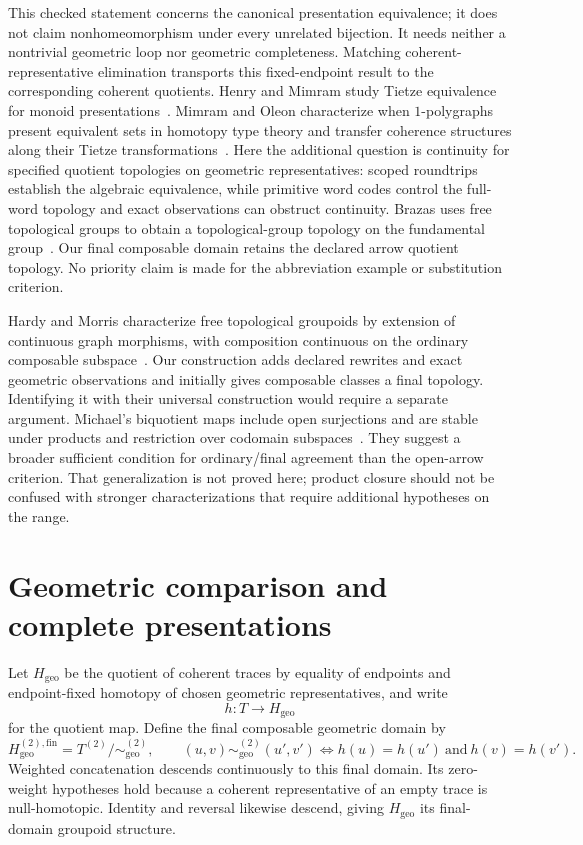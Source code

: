 \documentclass[10pt,reqno]{amsart}
\theoremstyle{definition}
\theoremstyle{plain}
\theoremstyle{remark}
\newcommand{\Fin}{\mathrm{fin}}
\begin{document}



This checked statement concerns the canonical presentation equivalence; it
does not claim nonhomeomorphism under every unrelated bijection. It needs
neither a nontrivial geometric loop nor geometric completeness. Matching
coherent-representative elimination transports this fixed-endpoint result
to the corresponding coherent quotients. Henry and Mimram study Tietze
equivalence for monoid presentations~\cite{HenryMimram21}. Mimram and Oleon
characterize when $1$-polygraphs present equivalent sets in homotopy type
theory and transfer coherence structures along their Tietze
transformations~\cite{MimramOleon25}. Here the additional question is
continuity for specified quotient topologies on geometric representatives:
scoped roundtrips establish the algebraic equivalence, while primitive word
codes control the full-word topology and exact observations can obstruct
continuity. Brazas uses free topological groups to
obtain a topological-group topology on the fundamental
group~\cite{Brazas13Tau}. Our final composable domain retains the declared
arrow quotient topology. No priority claim is made for the abbreviation
example or substitution criterion.

Hardy and Morris characterize free topological groupoids by extension of
continuous graph morphisms, with composition continuous on the ordinary
composable subspace~\cite{HardyMorris77}. Our construction adds declared
rewrites and exact geometric observations and initially gives composable
classes a final topology. Identifying it with their universal construction
would require a separate argument. Michael's biquotient maps include open
surjections and are stable under products and restriction over codomain
subspaces~\cite{Michael68}. They suggest a broader sufficient condition for
ordinary/final agreement than the open-arrow criterion. That generalization
is not proved here; product closure should not be confused with stronger
characterizations that require additional hypotheses on the range.

\section{Geometric comparison and complete presentations}
\label{sec:comparison}

Let $H_{\mathrm{geo}}$ be the quotient of coherent traces by equality of
endpoints and endpoint-fixed homotopy of chosen geometric representatives, and
write
\[
  h:T\longrightarrow H_{\mathrm{geo}}
\]
for the quotient map.  Define the final composable geometric domain by
\[
  H_{\mathrm{geo}}^{(2),\Fin}
  =T^{(2)}/\!\sim_{\mathrm{geo}}^{(2)},
  \qquad
  (u,v)\sim_{\mathrm{geo}}^{(2)}(u',v')
  \Longleftrightarrow h(u)=h(u')\ \text{and}\ h(v)=h(v').
\]
Weighted concatenation descends continuously to this final domain.
Its zero-weight hypotheses hold because a coherent representative of an
empty trace is null-homotopic. Identity and reversal likewise descend,
giving $H_{\mathrm{geo}}$ its final-domain groupoid structure.
\end{document}
